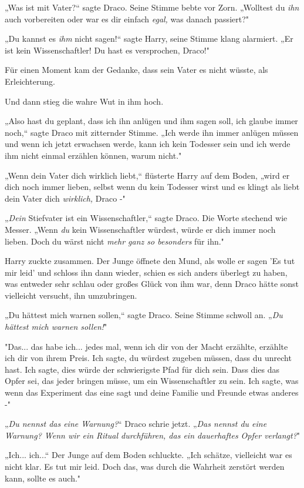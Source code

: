 {„Was ist mit Vater?“ sagte Draco. Seine Stimme bebte vor Zorn. „Wolltest du \emph{ihn} auch vorbereiten oder war es dir einfach \emph{egal,} was danach passiert?"

„Du kannst es \emph{ihm} nicht sagen!“ sagte Harry, seine Stimme klang alarmiert. „Er ist kein Wissenschaftler! Du hast es versprochen, Draco!"

Für einen Moment kam der Gedanke, dass sein Vater es nicht wüsste, als Erleichterung.

Und dann stieg die wahre Wut in ihm hoch.

„Also hast du geplant, dass ich ihn anlügen und ihm sagen soll, ich glaube immer noch,“ sagte Draco mit zitternder Stimme. „Ich werde ihn immer anlügen müssen und wenn ich jetzt erwachsen werde, kann ich kein Todesser sein und ich werde ihm nicht einmal erzählen können, warum nicht."

„Wenn dein Vater dich wirklich liebt,“ flüsterte Harry auf dem Boden, „wird er dich noch immer lieben, selbst wenn du kein Todesser wirst und es klingt als liebt dein Vater dich \emph{wirklich,} Draco -"

„\emph{Dein} Stiefvater ist ein Wissenschaftler,“ sagte Draco. Die Worte stechend wie Messer. „Wenn \emph{du} kein Wissenschaftler würdest, würde er dich immer noch lieben. Doch du wärst nicht \emph{mehr ganz so besonders} für ihn."

Harry zuckte zusammen. Der Junge öffnete den Mund, als wolle er sagen 'Es tut mir leid' und schloss ihn dann wieder, schien es sich anders überlegt zu haben, was entweder sehr schlau oder großes Glück von ihm war, denn Draco hätte sonst vielleicht versucht, ihn umzubringen.

„Du hättest mich warnen sollen,“ sagte Draco. Seine Stimme schwoll an. „\emph{Du hättest mich warnen sollen!}"

"Das... das habe ich... jedes mal, wenn ich dir von der Macht erzählte, erzählte ich dir von ihrem Preis. Ich sagte, du würdest zugeben müssen, dass du unrecht hast. Ich sagte, dies würde der schwierigste Pfad für dich sein. Dass dies das Opfer sei, das jeder bringen müsse, um ein Wissenschaftler zu sein. Ich sagte, was wenn das Experiment das eine sagt und deine Familie und Freunde etwas anderes -"

„\emph{Du nennst das eine Warnung?}“ Draco schrie jetzt. „\emph{Das nennst du eine Warnung? Wenn wir ein Ritual durchführen, das ein dauerhaftes Opfer verlangt?}"

„Ich... ich...“ Der Junge auf dem Boden schluckte. „Ich schätze, vielleicht war es nicht klar. Es tut mir leid. Doch das, was durch die Wahrheit zerstört werden kann, sollte es auch."

}

